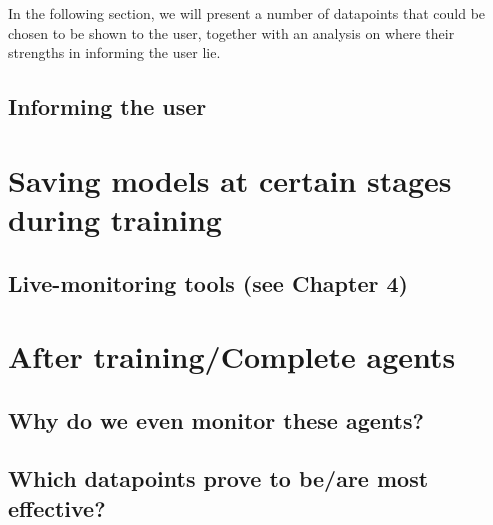 In the following section, we will present a number of datapoints that could be chosen to be shown to the user, together with an analysis on where their strengths in informing the user lie.

\subsection{Informing the user}



\section{Saving models at certain stages during training}
\subsection{Live-monitoring tools (see Chapter 4)}

\section{After training/Complete agents}
\subsection{Why do we even monitor these agents?}
\subsection{Which datapoints prove to be/are most effective?}